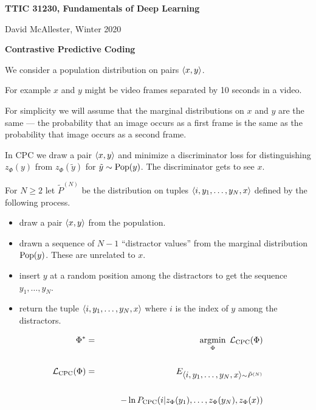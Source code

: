 





{\Huge
  \centerline{\bf TTIC 31230,  Fundamentals of Deep Learning}
  \vfill
  \centerline{David McAllester, Winter 2020}
  \vfill
  \centerline{\bf Contrastive Predictive Coding}
  \vfill
  \vfill
  

We consider a population distribution on pairs ${\mbox{$\langle x,y\rangle$}}$.

\vfill
For example $x$ and $y$ might be video frames separated by 10 seconds in a video.

\vfill
For simplicity we will assume that the marginal distributions on $x$ and $y$ are the same --- the probability that an image occurs as a first frame
is the same as the probability that image occurs as a second frame.

\vfill
In CPC we draw a pair ${\mbox{$\langle x,y\rangle$}}$ and {\color{red} minimize} a discriminator loss for distinguishing $z_\Phi(y)$ from $z_\Phi(\tilde{y})$ for $\tilde{y} \sim \mathrm{Pop}(y)$.
The discriminator gets to see $x$.


For $N \geq 2$ let  $\tilde{P}^{(N)}$ be the distribution on tuples ${\mbox{$\langle i,y_1,\ldots,y_N,x\rangle$}}$
defined by the following process.

\begin{itemize}
\item draw a pair ${\mbox{$\langle x,y\rangle$}}$ from the population.

\item drawn a sequence of $N-1$ ``distractor values'' from the marginal distribution $\mathrm{Pop}(y)$.  These are unrelated to $x$.

\item insert $y$ at a random position among the distractors to get the sequence
$y_1,\ldots,y_N$.

\item return the tuple ${\mbox{$\langle i,y_1,\ldots,y_N,x\rangle$}}$ where $i$ is the index of $y$ among the distractors.
\end{itemize}


\begin{eqnarray*}
\Phi^*  & = & \operatorname*{argmin}_\Phi\;{\cal L}_\mathrm{CPC}(\Phi) \\
\\
{\cal L}_\mathrm{CPC}(\Phi) &= & E_{{\mbox{$\langle i,y_1,\ldots,y_N,x\rangle$}} \sim \tilde{P}^{(N)}} \\
\\
& & ~\;\;\;\;\;\; -\ln P_\mathrm{CPC}(i|z_\Phi(y_1),\ldots,z_\Phi(y_N),z_\Phi(x))
\end{eqnarray*}

}
